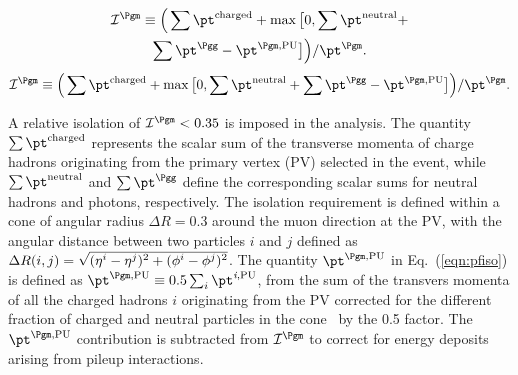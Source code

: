 \begin{linenomath}
	{
		\begin{multline}
		\label{eqn:pfiso}
		{\mathcal I}^{\Pgm} \equiv \Big( \sum \pt^\text{charged} + \max\big[ 0, \sum \pt^\text{neutral} +\\
		\sum \pt^{\Pgg} - \pt^{\Pgm,\mathrm{PU}} \big] \Big) / \pt^{\Pgm} .
		\end{multline}
	}
	{
		\begin{equation}
		\label{eqn:pfiso}
		{\mathcal I}^{\Pgm} \equiv \Big( \sum \pt^\text{charged} + \max\big[ 0, \sum \pt^\text{neutral} +
		\sum \pt^{\Pgg} - \pt^{\Pgm,\mathrm{PU}} \big] \Big) / \pt^{\Pgm} .
		\end{equation}
	}
\end{linenomath}

{ A relative isolation of ${\mathcal I}^{\Pgm}<0.35$ is imposed in the analysis. The quantity $\sum \pt^\text{charged}$ represents the scalar sum of the transverse momenta of charge hadrons originating from the primary vertex (PV) selected in the event, while $\sum \pt^\text{neutral}$ and $\sum \pt^{\Pgg}$ define the corresponding scalar sums for neutral hadrons and photons, respectively.
The isolation requirement is defined within a cone of angular radius $\Delta R=0.3$ around the muon direction at the PV, with the angular distance between two particles $i$ and $j$ defined as $\Delta R(i,j) = \sqrt{\smash[b]{(\eta^i-\eta^j)^{2} + (\phi^i-\phi^j)^{2}}}$.
The quantity $\pt^{\Pgm,\mathrm{PU}}$ in Eq.~(\ref{eqn:pfiso}) is defined as $\pt^{\Pgm,\mathrm{PU}}\equiv0.5\sum_{i}\pt^\text{\textit{i},PU}$, from the sum of the transvers momenta of all the charged hadrons $i$ originating from the PV corrected for the different fraction of charged and neutral particles in the cone~\cite{PUmitigationCMS} by the 0.5 factor. The $\pt^{\Pgm,\mathrm{PU}}$ contribution is subtracted from ${\mathcal I}^{\Pgm}$ to correct for energy deposits arising from pileup interactions.\par}

